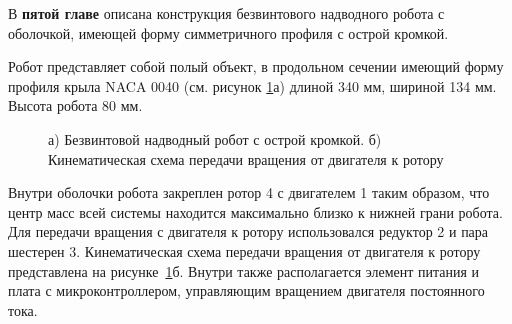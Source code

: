 В {\textbf{пятой главе}} описана конструкция безвинтового надводного робота с оболочкой, имеющей форму симметричного профиля с острой кромкой.

Робот представляет собой полый объект, в продольном сечении имеющий форму профиля крыла NACA 0040 (см. рисунок \ref{Photo_NACA}а) длиной 340 мм, шириной 134 мм. Высота робота 80 мм. 



\begin{figure}[h]
	\begin{minipage}[h]{0.5\linewidth}
	\end{minipage}
	\hfill
	\begin{minipage}[h]{0.5\linewidth}
	\end{minipage}
	
	\begin{minipage}[h]{0.5\linewidth}
	\end{minipage}
	\hfill
	\begin{minipage}[h]{0.5\linewidth}
	\end{minipage}
	\caption{а) Безвинтовой надводный робот с острой кромкой. б) Кинематическая схема передачи вращения от двигателя к ротору}
	\label{Photo_NACA}
\end{figure}

Внутри оболочки робота закреплен ротор 4 с двигателем 1 таким образом, что центр масс всей системы находится максимально близко к нижней грани робота. Для передачи вращения с двигателя к ротору использовался редуктор 2 и пара шестерен 3. Кинематическая схема передачи вращения от двигателя к ротору представлена на рисунке~\ref{Photo_NACA}б. Внутри также располагается элемент питания и плата с микроконтроллером, управляющим вращением двигателя постоянного тока. %


